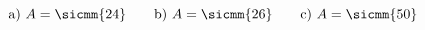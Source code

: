 \begin{exercise}
  \fi
  \ifoutcome\outcome
    \begin{equation*}
      \text{a)~}A=\sicmm{24}
      \qquad
      \text{b)~}A=\sicmm{26}
      \qquad
      \text{c)~}A=\sicmm{50}
    \end{equation*}
  \fi
\end{exercise}
